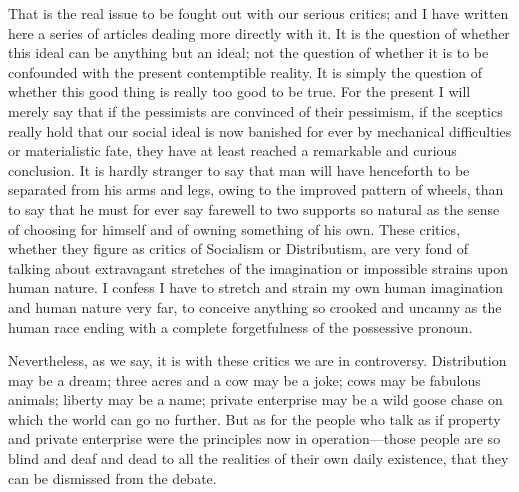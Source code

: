 \documentclass{book}
\begin{document}
That is the real issue to be fought out with our serious critics; and I have written here a series of articles dealing more directly with it. It is the question of whether this ideal can be anything but an ideal; not the question of whether it is to be confounded with the present contemptible reality. It is simply the question of whether this good thing is really too good to be true. For the present I will merely say that if the pessimists are convinced of their pessimism, if the sceptics really hold that our social ideal is now banished for ever by mechanical difficulties or materialistic fate, they have at least reached a remarkable and curious conclusion. It is hardly stranger to say that man will have henceforth to be separated from his arms and legs, owing to the improved pattern of wheels, than to say that he must for ever say farewell to two supports so natural as the sense of choosing for himself and of owning something of his own. These critics, whether they figure as critics of Socialism or Distributism, are very fond of talking about extravagant stretches of the imagination or impossible strains upon human nature. I confess I have to stretch and strain my own human imagination and human nature very far, to conceive anything so crooked and uncanny as the human race ending with a complete forgetfulness of the possessive pronoun.

Nevertheless, as we say, it is with these critics we are in controversy. Distribution may be a dream; three acres and a cow may be a joke; cows may be fabulous animals; liberty may be a name; private enterprise may be a wild goose chase on which the world can go no further. But as for the people who talk as if property and private enterprise were the principles now in operation—those people are so blind and deaf and dead to all the realities of their own daily existence, that they can be dismissed from the debate.
\end{document}
